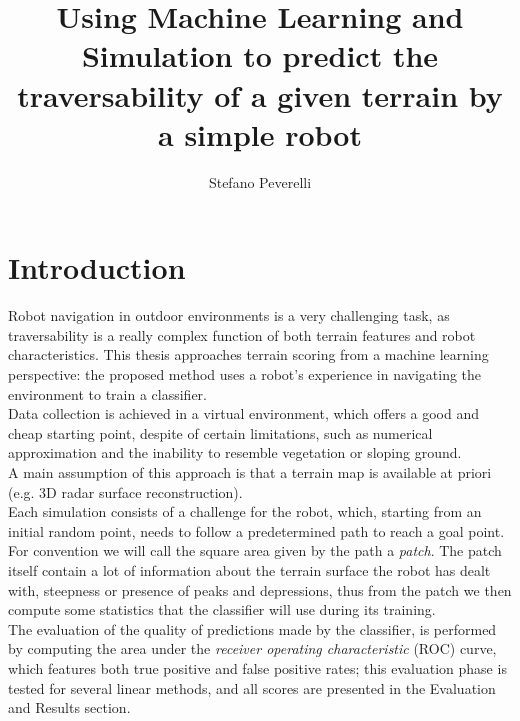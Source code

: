 \documentclass[]{usiinfbachelorproject}
\author{Stefano Peverelli}
\title{Using Machine Learning and Simulation to predict the traversability of a given terrain by a simple robot}
\begin{document}
\maketitle
\tableofcontents
\newpage
\section{Introduction} \label{introduction}
Robot navigation in outdoor environments is a very challenging task, as traversability is a really complex function of both terrain features and robot characteristics.
This thesis approaches terrain scoring from a machine learning perspective: the proposed method uses a robot's experience in navigating the environment to train a
classifier. \\
Data collection is achieved in a virtual environment, which offers a good and cheap starting point, despite of certain limitations, such as numerical approximation and the inability to resemble
vegetation or sloping ground. \\
A main assumption of this approach is that a terrain map is available at priori (e.g. 3D radar surface reconstruction). \\
Each simulation consists of a challenge for the robot, which, starting from an initial random point, needs to follow a predetermined path to reach a goal point. For convention we will call the
square area given by the path a \textit{patch}.
The patch itself contain a lot of information about the terrain surface the robot has dealt with, steepness or presence of peaks and depressions, thus from the patch we then compute some
statistics that the classifier will use during its training.\\
The evaluation of the quality of predictions made by the classifier, is performed by computing the area under the \textit{receiver operating characteristic} (ROC) curve, which features both true positive
and false positive rates; this evaluation phase is tested for several linear methods, and all scores are presented in the Evaluation and Results section.
\end{document}
